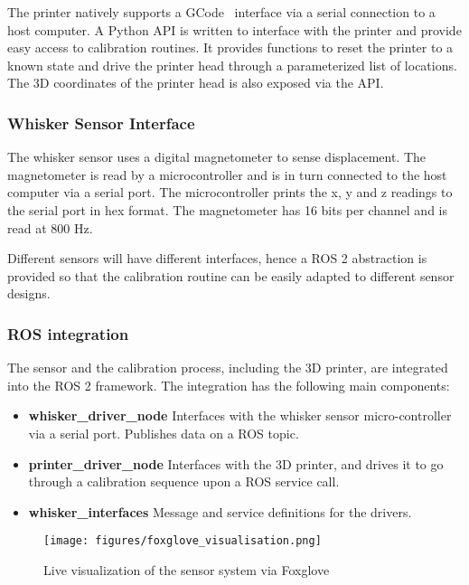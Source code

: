 \documentclass[runningheads]{llncs}
\begin{document}
The printer natively supports a GCode~\cite{kramerNISTRS274NGCInterpreter2000} interface via a serial connection to a host computer. A Python API is written to interface with the printer and provide easy access to calibration routines. It provides functions to reset the printer to a known state and drive the printer head through a parameterized list of locations. The 3D coordinates of the printer head is also exposed via the API.

\subsubsection{Whisker Sensor Interface}

The whisker sensor uses a digital magnetometer to sense displacement. The magnetometer is read by a microcontroller and is in turn connected to the host computer via a serial port. The microcontroller prints the x, y and z readings to the serial port in hex format. The magnetometer has 16 bits per channel and is read at 800 Hz.

Different sensors will have different interfaces, hence a ROS 2 abstraction is provided so that the calibration routine can be easily adapted to different sensor designs.

\subsubsection{ROS integration}

The sensor and the calibration process, including the 3D printer, are integrated into the ROS 2 framework. The integration has the following main components:

\begin{itemize}
    \item \textbf{whisker\_driver\_node} Interfaces with the whisker sensor micro-controller via a serial port. Publishes data on a ROS topic.
    \item \textbf{printer\_driver\_node} Interfaces with the 3D printer, and drives it to go through a calibration sequence upon a ROS service call.
    \item \textbf{whisker\_interfaces} Message and service definitions for the drivers.
\end{itemize}

\begin{wrapfigure}{r}{.45\textwidth}
    \centering
    \texttt{[image: figures/foxglove\_visualisation.png]}
    \caption{Live visualization of the sensor system via Foxglove}
    \label{fig:foxglove}
\end{wrapfigure}
\end{document}
